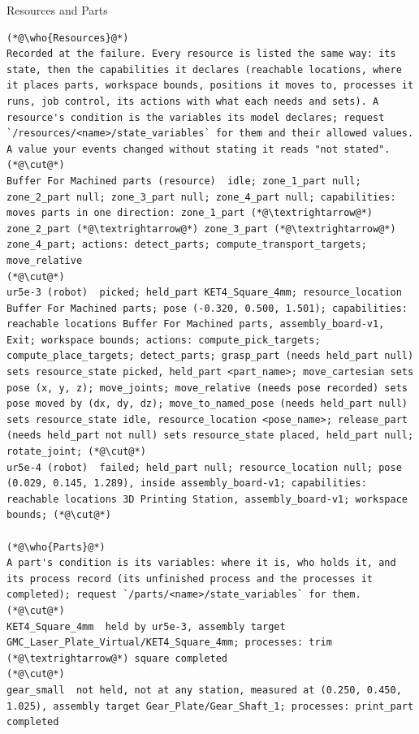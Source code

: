 \begin{recbox}{Resources and Parts}
\begin{lstlisting}
(*@\who{Resources}@*)
Recorded at the failure. Every resource is listed the same way: its state, then the capabilities it declares (reachable locations, where it places parts, workspace bounds, positions it moves to, processes it runs, job control, its actions with what each needs and sets). A resource's condition is the variables its model declares; request `/resources/<name>/state_variables` for them and their allowed values. A value your events changed without stating it reads "not stated".
(*@\cut@*)
Buffer For Machined parts (resource)  idle; zone_1_part null; zone_2_part null; zone_3_part null; zone_4_part null; capabilities: moves parts in one direction: zone_1_part (*@\textrightarrow@*) zone_2_part (*@\textrightarrow@*) zone_3_part (*@\textrightarrow@*) zone_4_part; actions: detect_parts; compute_transport_targets; move_relative
(*@\cut@*)
ur5e-3 (robot)  picked; held_part KET4_Square_4mm; resource_location Buffer For Machined parts; pose (-0.320, 0.500, 1.501); capabilities: reachable locations Buffer For Machined parts, assembly_board-v1, Exit; workspace bounds; actions: compute_pick_targets; compute_place_targets; detect_parts; grasp_part (needs held_part null) sets resource_state picked, held_part <part_name>; move_cartesian sets pose (x, y, z); move_joints; move_relative (needs pose recorded) sets pose moved by (dx, dy, dz); move_to_named_pose (needs held_part null) sets resource_state idle, resource_location <pose_name>; release_part (needs held_part not null) sets resource_state placed, held_part null; rotate_joint; (*@\cut@*)
ur5e-4 (robot)  failed; held_part null; resource_location null; pose (0.029, 0.145, 1.289), inside assembly_board-v1; capabilities: reachable locations 3D Printing Station, assembly_board-v1; workspace bounds; (*@\cut@*)

(*@\who{Parts}@*)
A part's condition is its variables: where it is, who holds it, and its process record (its unfinished process and the processes it completed); request `/parts/<name>/state_variables` for them.
(*@\cut@*)
KET4_Square_4mm  held by ur5e-3, assembly target GMC_Laser_Plate_Virtual/KET4_Square_4mm; processes: trim (*@\textrightarrow@*) square completed
(*@\cut@*)
gear_small  not held, not at any station, measured at (0.250, 0.450, 1.025), assembly target Gear_Plate/Gear_Shaft_1; processes: print_part completed
\end{lstlisting}
\end{recbox}

